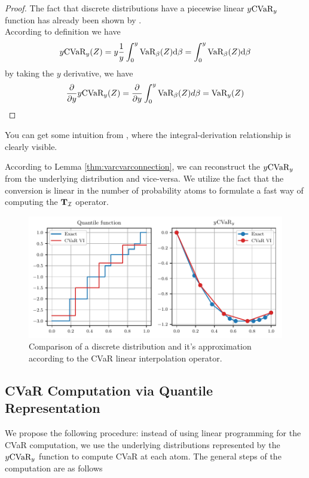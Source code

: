 \begin{proof}
The fact that discrete distributions have a piecewise linear $y\text{CVaR}_y$ function has already been shown by \citet{rockafellar2000optimization}.
\\
According to definition  we have
\begin{equation*}
y\text{CVaR}_y(Z) = y\dfrac{1}{y}\int_0^y \text{VaR}_\beta(Z) \text{d} \beta = \int_0^y \text{VaR}_\beta(Z) \text{d} \beta
\end{equation*}
by taking the $y$ derivative, we have
\begin{equation*}
\dfrac{\partial}{\partial y} y \text{CVaR}_y(Z) = \dfrac{\partial}{\partial y} \int_0^y \text{VaR}_\beta(Z) d\beta = \text{VaR}_y(Z)
\end{equation*}
\end{proof}
You can get some intuition from , where the integral-derivation relationship is clearly visible.

According to Lemma \ref{thm:varcvarconnection}, we can reconstruct the $y\text{CVaR}_y$ from the underlying distribution and vice-versa. We utilize the fact that the conversion is linear in the number of probability atoms to formulate a fast way of computing the $\mathbf{T}_{\mathcal{I}}$ operator.

\begin{figure}
\center
\includegraphics[width=0.8\linewidth]{gfx/cvar_visualized.pdf}
\caption{Comparison of a discrete distribution and it's approximation according to the CVaR linear interpolation operator.}
\label{fig:cvarvisual}
\end{figure}

\subsection{CVaR Computation via Quantile Representation}

We propose the following procedure: instead of using linear programming for the CVaR computation, we use the underlying distributions represented by the $y\text{CVaR}_y$ function to compute CVaR at each atom. The general steps of the computation are as follows

